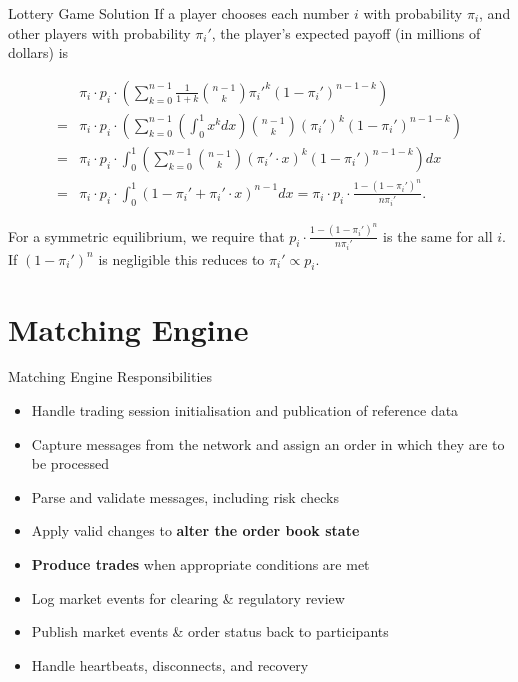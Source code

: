 \documentclass{beamer}
\newif\ifhasdiagram
\newcommand{\sectiondiagram}[1]{%
    \def\insertsdiagram{#1}%
    \hasdiagramtrue
}
\newcommand{\sectionquote}[1]{%
    \def\insertsquote{\small #1}%
}
\newcommand{\insertsdiagram}{}
\newcommand{\insertsquote}{}
\renewcommand{\insertsquote}{}
\renewcommand{\insertsdiagram}{}
\begin{document}
\begin{frame}{Lottery Game Solution}
	If a player chooses each number $i$ with probability $\pi_i$, and other players with probability $\pi_i'$, the player's expected payoff (in millions of dollars) is

	\begin{align*}
			& \pi_i \cdot p_i \cdot \left(\sum_{k=0}^{n-1}\frac{1}{1+k}\binom{n-1}{k} \pi_i'^k (1-\pi_i')^{n-1-k}\right) \\
		=	& \pi_i \cdot p_i \cdot \left(\sum_{k=0}^{n-1} \left(\int_0^1 x^k dx\right)\binom{n-1}{k} (\pi_i')^k(1-\pi_i')^{n-1-k} \right) \\
		=	& \pi_i \cdot p_i \cdot \int_0^1 \left(\sum_{k=0}^{n-1} \binom{n-1}{k} (\pi_i'\cdot x)^k (1-\pi_i')^{n-1-k} \right)dx \\
		=	& \pi_i \cdot p_i \cdot \int_0^1 (1 - \pi_i' + \pi_i'\cdot x)^{n-1} dx = \pi_i \cdot p_i \cdot \frac{1 - (1-\pi_i')^n}{n\pi_i'}.
	\end{align*}

	For a symmetric equilibrium, we require that $p_i \cdot \frac{1 - (1-\pi_i')^n}{n\pi_i'}$ is the same for all $i$. If $(1-\pi_i')^n$ is negligible this reduces to $\pi_i'\propto p_i$.
\end{frame}

\sectiondiagram{matching}
\sectionquote{``The most amazing achievement of the computer software industry is its continuing cancellation of the steady and staggering gains made by the computer hardware industry.'' Henry Petroski}
\section{Matching Engine}

\begin{frame}{Matching Engine Responsibilities}
	\begin{itemize}
		\item Handle trading session initialisation and publication of reference data
		\item Capture messages from the network and assign an order in which they are to be processed
		\item Parse and validate messages, including risk checks
		\item Apply valid changes to \textbf{alter the order book state}
		\item \textbf{Produce trades} when appropriate conditions are met
		\item Log market events for clearing \& regulatory review
		\item Publish market events \& order status back to participants
		\item Handle heartbeats, disconnects, and recovery
	\end{itemize}
\end{frame}
\end{document}
